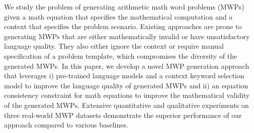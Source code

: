 We study the problem of generating arithmetic math word problems (MWPs) given a math equation that specifies the mathematical computation and a context that specifies the problem scenario. Existing approaches are prone to generating MWPs that are either mathematically invalid or have unsatisfactory language quality. They also either ignore the context or require manual specification of a problem template, which compromises the diversity of the generated MWPs. In this paper, we develop a novel MWP generation approach that leverages i) pre-trained language models and a context keyword selection model to improve the language quality of generated MWPs and ii) an equation consistency constraint for math equations to improve the mathematical validity of the generated MWPs. Extensive quantitative and qualitative experiments on three real-world MWP datasets demonstrate the superior performance of our approach compared to various baselines.
